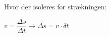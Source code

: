 Hvor der isoleres for strækningen:\\

\begin{center}
\begin{math}
v = \dfrac{\Delta s}{\Delta t} \longrightarrow \Delta s = v \cdot \delta t
\end{math}
\end{center}






















